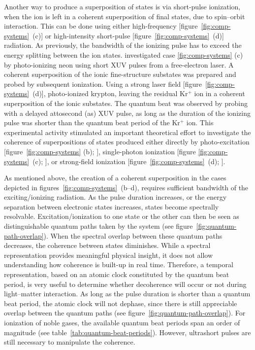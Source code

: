Another way to produce a superposition of states is via short-pulse
ionization, when the ion is left in a coherent superposition of final
states, \eg due to spin--orbit interaction. This can be done using
either high-frequency [figure~\ref{fig:comp-systems}~(c)] or
high-intensity short-pulse [figure~\ref{fig:comp-systems}~(d)]
radiation. As previously, the bandwidth of the ionizing pulse has to
exceed the energy splitting between the ion
states. \textcite{Kurka2009} investigated case \ref{fig:comp-systems}
(c) by photo-ionizing neon using short XUV pulses from a free-electron
laser. A coherent superposition of the ionic fine-structure substates
was prepared and probed by subsequent ionization. Using a strong laser
field [figure~\ref{fig:comp-systems}~(d)], \textcite{Goulielmakis2010}
photo-ionized krypton, leaving the residual Kr\(^+\) ion in a coherent
superposition of the ionic substates. The quantum beat was observed by
probing with a delayed attosecond (\si{\atto\second}) XUV pulse, as
long as the duration of the ionizing pulse was shorter than
the quantum beat period of the Kr\(^+\) ion.
This experimental activity stimulated an important theoretical effort
to investigate the coherence of superpositions of states produced
either directly by photo-excitation [figure~\ref{fig:comp-systems}
(b); \cite{Tzallas2011NP,Klunder2013PRA}], single-photon ionization
[figure \ref{fig:comp-systems}~(c); \cite{Nikolopoulos2013PRL}], or
strong-field ionization [figure~\ref{fig:comp-systems}~(d);
\cite{Pabst2011PRL,Pabst2016}].

As mentioned above, the creation of a coherent superposition in the
cases depicted in figures~\ref{fig:comp-systems}~(b--d), requires
sufficient bandwidth of the exciting/ionizing radiation. As the pulse
duration increases, or the energy separation between electronic states
increases, states become spectrally resolvable. Excitation/ionization
to one state or the other can then be seen as distinguishable quantum
paths taken by the system (see
figure~\ref{fig:quantum-path-overlap}). When the spectral overlap
between these quantum paths decreases, the coherence between states
diminishes. While a spectral representation provides meaningful
physical insight, it does not allow understanding how coherence is
built-up in real time. Therefore, a temporal representation, based on
an atomic clock constituted by the quantum beat period, is very useful
to determine whether decoherence will occur or not during light--matter
interaction. As long as the pulse duration is shorter than a quantum
beat period, the atomic clock will not dephase, since there is still
appreciable overlap between the quantum paths (see
figure~\ref{fig:quantum-path-overlap}). For ionization of noble gases,
the available quantum beat periods span an order of magnitude (see
table~\ref{tab:quantum-beat-periods}). However, ultrashort pulses are
still necessary to manipulate the coherence.

